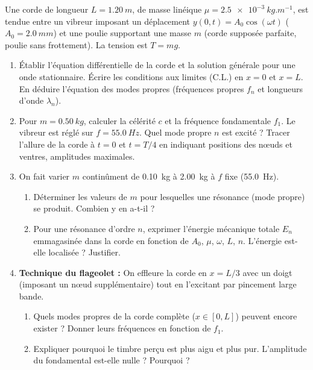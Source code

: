 \documentclass[11pt]{article}
\begin{document}
\begin{exercice}
Une corde de longueur $L = \SI{1,20}{m}$, de masse linéique $\mu = \SI{2,5e-3}{kg.m^{-1}}$, est tendue entre un vibreur imposant un déplacement $y(0,t)=A_0\cos(\omega t)$ ($A_0=\SI{2,0}{mm}$) et une poulie supportant une masse $m$ (corde supposée parfaite, poulie sans frottement). La tension est $T=mg$.
\begin{enumerate}
    \item Établir l'équation différentielle de la corde et la solution générale pour une onde stationnaire. Écrire les conditions aux limites (C.L.) en $x=0$ et $x=L$. En déduire l'équation des modes propres (fréquences propres $f_n$ et longueurs d'onde $\lambda_n$).
    \item Pour $m = \SI{0,50}{kg}$, calculer la célérité $c$ et la fréquence fondamentale $f_1$. Le vibreur est réglé sur $f = \SI{55,0}{Hz}$. Quel mode propre $n$ est excité ? Tracer l'allure de la corde à $t=0$ et $t=T/4$ en indiquant positions des nœuds et ventres, amplitudes maximales.
    \item On fait varier $m$ continûment de \SI{0,10}{kg} à \SI{2,00}{kg} à $f$ fixe (\SI{55,0}{Hz}). 
    \begin{enumerate}
        \item Déterminer les valeurs de $m$ pour lesquelles une résonance (mode propre) se produit. Combien y en a-t-il ?
        \item Pour une résonance d'ordre $n$, exprimer l'énergie mécanique totale $E_n$ emmagasinée dans la corde en fonction de $A_0$, $\mu$, $\omega$, $L$, $n$. L'énergie est-elle localisée ? Justifier.
    \end{enumerate}
    \item \textbf{Technique du flageolet :} On effleure la corde en $x = L/3$ avec un doigt (imposant un nœud supplémentaire) tout en l'excitant par pincement large bande. 
    \begin{enumerate}
        \item Quels modes propres de la corde complète ($x\in[0,L]$) peuvent encore exister ? Donner leurs fréquences en fonction de $f_1$.
        \item Expliquer pourquoi le timbre perçu est plus aigu et plus pur. L'amplitude du fondamental est-elle nulle ? Pourquoi ?
    \end{enumerate}
\end{enumerate}
\end{exercice}
\end{document}
